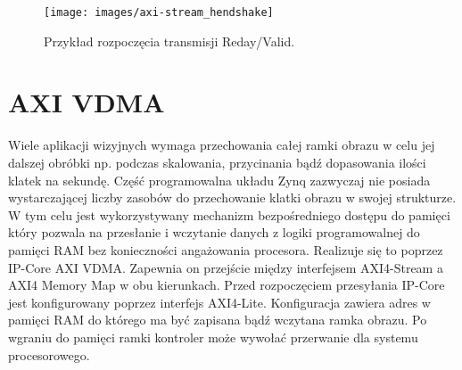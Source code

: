 \begin{figure}[h]
    \centering
    \texttt{[image: images/axi-stream\_hendshake]}
    \caption{Przykład rozpoczęcia transmisji Reday/Valid.}
    \label{fig:handshake}
\end{figure}

\section{AXI VDMA}
Wiele aplikacji wizyjnych wymaga przechowania całej ramki obrazu w celu jej dalszej obróbki np. podczas skalowania, przycinania bądź dopasowania ilości klatek na sekundę. Część programowalna układu Zynq zazwyczaj nie posiada wystarczającej liczby zasobów do przechowanie klatki obrazu w swojej strukturze. W tym celu jest wykorzystywany mechanizm bezpośredniego dostępu do pamięci który pozwala na przesłanie i wczytanie danych z logiki programowalnej do pamięci RAM bez konieczności angażowania procesora. Realizuje się to poprzez IP-Core AXI VDMA. Zapewnia on przejście między interfejsem AXI4-Stream a AXI4 Memory Map w obu kierunkach. Przed rozpoczęciem przesyłania IP-Core jest konfigurowany poprzez interfejs AXI4-Lite. Konfiguracja zawiera adres w pamięci RAM do którego ma być zapisana bądź wczytana ramka obrazu. Po wgraniu do pamięci ramki kontroler może wywołać przerwanie dla systemu procesorowego.